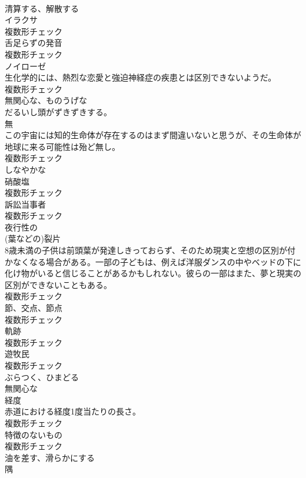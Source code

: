 \documentclass[8pt]{extreport}
\begin{document}
\begin{CJK}{UTF8}{min}
\\	[動詞]	清算する、解散する	
\\	[名詞]	イラクサ	
\\	複数形チェック
\\	[名詞]	舌足らずの発音	
\\	複数形チェック
\\	[名詞]	ノイローゼ	
\\	生化学的には、熱烈な恋愛と強迫神経症の疾患とは区別できないようだ。	
\\	複数形チェック
\\	[形容詞]	無関心な、ものうげな	
\\	だるいし頭がずきずきする。	
\\	[名詞]	無	
\\	この宇宙には知的生命体が存在するのはまず間違いないと思うが、その生命体が地球に来る可能性は殆ど無し。	
\\	複数形チェック
\\	[形容詞]	しなやかな	
\\	[名詞]	硝酸塩	
\\	複数形チェック
\\	[名詞]	訴訟当事者	
\\	複数形チェック
\\	[形容詞]	夜行性の	
\\	[名詞]	(葉などの)裂片	
\\	8歳未満の子供は前頭葉が発達しきっておらず、そのため現実と空想の区別が付かなくなる場合がある。一部の子どもは、例えば洋服ダンスの中やベッドの下に化け物がいると信じることがあるかもしれない。彼らの一部はまた、夢と現実の区別ができないこともある。	
\\	複数形チェック
\\	[名詞]	節、交点、節点	
\\	複数形チェック
\\	[名詞]	軌跡	
\\	複数形チェック
\\	[名詞]	遊牧⺠	
\\	複数形チェック
\\	[動詞]	ぶらつく、ひまどる	
\\	[形容詞]	無関心な	
\\	[名詞]	経度	
\\	赤道における経度1度当たりの長さ。	
\\	複数形チェック
\\	[名詞]	特徴のないもの	
\\	複数形チェック
\\	[動詞]	油を差す、滑らかにする	
\\	[名詞]	隅	

\end{CJK}
\end{document}
